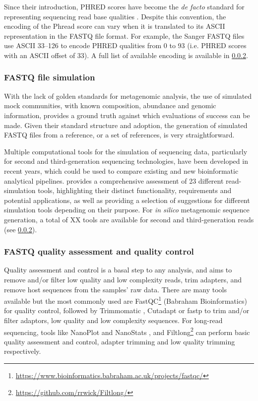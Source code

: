 Since their introduction, PHRED scores have become the \textit{de facto} standard for representing sequencing read base qualities \citep{cock_sanger_2010}. Despite this convention, the encoding of the Phread score can vary when it is translated to its ASCII representation in the FASTQ file format. For example, the Sanger FASTQ files use ASCII 33–126 to encode PHRED qualities from 0 to 93 (i.e. PHRED scores with an ASCII offset of 33). A full list of available encoding is available in \ref{}. 


\subsubsection{FASTQ file simulation}

With the lack of golden standards for metagenomic analysis, the use of simulated mock communities, with known composition, abundance and genomic information, provides a ground truth against which evaluations of success can be made. Given their standard structure and adoption, the generation of simulated FASTQ files from a reference, or a set of references, is very straightforward. 

Multiple computational tools for the simulation of sequencing data, particularly for second and third-generation sequencing technologies, have been developed in recent years, which could be used to compare existing and new bioinformatic analytical pipelines. \cite{escalona_comparison_2016} provides a comprehensive assessment of 23 different read-simulation tools,  highlighting their distinct functionality, requirements and potential applications, as well as providing a selection of suggestions for different simulation tools depending on their purpose. For \textit{in silico} metagenomic sequence generation, a total of XX tools are available for second and third-generation reads (see \ref{}).


\subsubsection{FASTQ quality assessment and quality control}

Quality assessment and control is a basal step to any analysis, and aims to remove and/or filter low quality and low complexity reads, trim adapters, and remove host sequences from the samples’ raw data. There are many tools available but the most commonly used are FastQC\footnote{\url{https://www.bioinformatics.babraham.ac.uk/projects/fastqc/}} (Babraham Bioinformatics) for quality control, followed by Trimmomatic \citep{bolger_trimmomatic_2014}, Cutadapt \citep{martin_cutadapt_2011} or fastp \citep{chen_fastp_2018} to trim and/or filter adaptors, low quality and low complexity sequences. For long-read sequencing, tools like NanoPlot and NanoStats \citep{de_coster_nanopack_2018}, and Filtlong\footnote{\url{https://github.com/rrwick/Filtlong/}} can perform basic quality assessment and control, adapter trimming and low quality trimming respectively. 


